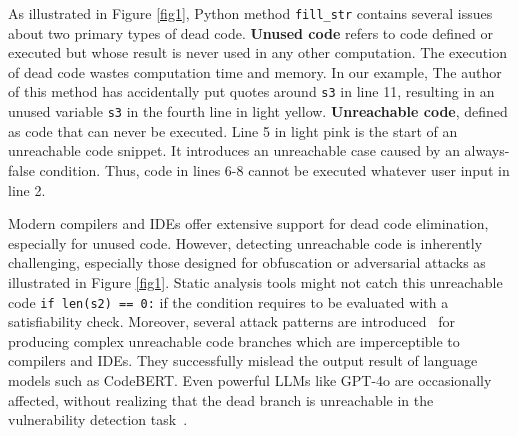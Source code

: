 \documentclass[11pt]{article}
\begin{document}
As illustrated in Figure \ref{fig1}, Python method \texttt{fill\_str} contains several issues about two primary types of dead code. \textbf{Unused code} refers to code defined or executed but whose result is never used in any other computation. The execution of dead code wastes computation time and memory. In our example, The author of this method has accidentally put quotes around \texttt{s3} in line 11, resulting in an unused variable \texttt{s3} in the fourth line in light yellow.
\textbf{Unreachable code}, defined as code that can never be executed. Line 5 in light pink is the start of an unreachable code snippet. It introduces an unreachable case caused by an always-false condition. Thus, code in lines 6-8 cannot be executed whatever user input in line 2.

Modern compilers and IDEs offer extensive support for dead code elimination, especially for unused code. However, detecting unreachable code is inherently challenging, especially those designed for obfuscation or adversarial attacks as illustrated in Figure \ref{fig1}.
Static analysis tools might not catch this unreachable code \texttt{if len(s2) == 0:} if the condition requires to be evaluated with a satisfiability check. Moreover, several attack patterns are introduced~\cite{gao2023discrete} for producing complex unreachable code branches which are imperceptible to compilers and IDEs. They successfully mislead the output result of language models such as CodeBERT. Even powerful LLMs like GPT-4o are occasionally affected, without realizing that the dead branch is unreachable in the vulnerability detection task~\cite{khare2023understanding}.

\end{document}
